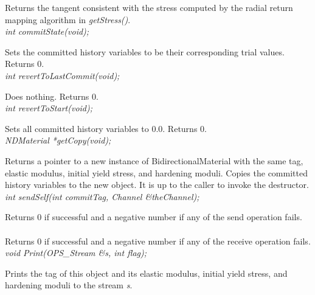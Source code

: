 Returns the tangent consistent with the stress computed by the radial
return mapping algorithm in {\em getStress()}. \\

{\em int commitState(void); } 

Sets the committed history variables to be their corresponding trial
values. Returns 0. \\

{\em int revertToLastCommit(void); } 

Does nothing. Returns 0. \\

{\em int revertToStart(void); } 

Sets all committed history variables to $0.0$. Returns 0. \\

{\em NDMaterial *getCopy(void); } 

Returns a pointer to a new instance of BidirectionalMaterial with the 
same tag, elastic modulus, initial yield stress, and 
hardening moduli. Copies the committed history variables to the 
new object. It is up to the caller to invoke the destructor. \\

{\em int sendSelf(int commitTag, Channel \&theChannel); }

Returns 0 if successful and a negative number if any of the 
send operation fails. \\

\\
Returns 0 if successful and a negative number if any of the 
receive operation fails. \\

{\em void Print(OPS_Stream \&s, int flag);} 

Prints the tag of this object and its elastic modulus, initial yield
stress, and hardening moduli to the stream {\em s}.
